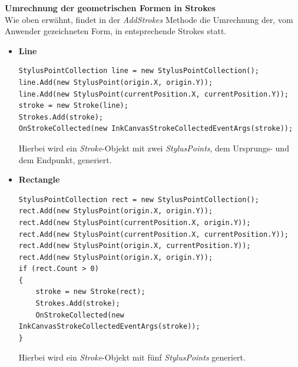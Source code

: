 \textbf{Umrechnung der geometrischen Formen in Strokes}\\
Wie oben erwähnt, findet in der \textit{AddStrokes} Methode die Umrechnung der, vom Anwender gezeichneten Form, in entsprechende Strokes statt. 
\begin{itemize}
\item \textbf{Line}
\begin{lstlisting}[language = CSharp, captionpos=b, caption={Linie in Strokes konvertieren}]
StylusPointCollection line = new StylusPointCollection();
line.Add(new StylusPoint(origin.X, origin.Y));
line.Add(new StylusPoint(currentPosition.X, currentPosition.Y));
stroke = new Stroke(line);
Strokes.Add(stroke);
OnStrokeCollected(new InkCanvasStrokeCollectedEventArgs(stroke));
\end{lstlisting}
Hierbei wird ein \textit{Stroke}-Objekt mit zwei \textit{StylusPoints}, dem Ursprungs- und dem Endpunkt, generiert.
\newpage
\item \textbf{Rectangle}
\begin{lstlisting}[language = CSharp, captionpos=b, caption={Rechteck in Strokes konvertieren}]
StylusPointCollection rect = new StylusPointCollection();
rect.Add(new StylusPoint(origin.X, origin.Y));
rect.Add(new StylusPoint(currentPosition.X, origin.Y));
rect.Add(new StylusPoint(currentPosition.X, currentPosition.Y));
rect.Add(new StylusPoint(origin.X, currentPosition.Y));
rect.Add(new StylusPoint(origin.X, origin.Y));
if (rect.Count > 0)
{
	stroke = new Stroke(rect);
	Strokes.Add(stroke);
	OnStrokeCollected(new InkCanvasStrokeCollectedEventArgs(stroke));
}
\end{lstlisting}
Hierbei wird ein \textit{Stroke}-Objekt mit fünf \textit{StylusPoints} generiert. 


\end{itemize}
